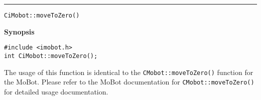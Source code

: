 \noindent
\vspace{5pt}
\rule{6.5in}{0.015in}
\noindent
{\LARGE \texttt{CiMobot::moveToZero()}}\\
{}

\noindent
{\bf Synopsis}\\
\begin{verbatim}
#include <imobot.h>
int CiMobot::moveToZero();
\end{verbatim}

The usage of this function is identical to the
\texttt{CMobot::moveToZero()} function for the MoBot.
Please refer to the MoBot documentation for \texttt{CMobot::moveToZero()} for
detailed usage documentation.

